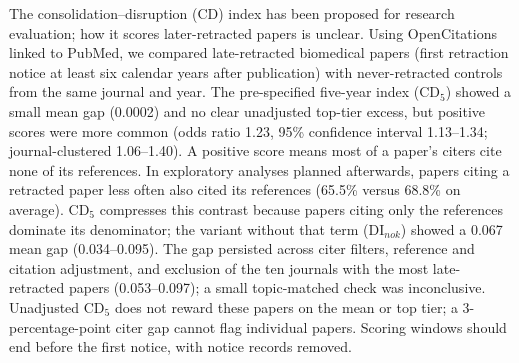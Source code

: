 The consolidation--disruption (CD) index has been proposed for research evaluation; how it scores later-retracted
papers is unclear. Using OpenCitations linked to PubMed, we compared late-retracted biomedical papers (first retraction
notice at least six calendar years after publication) with never-retracted controls from the same journal and year.
The pre-specified five-year index (CD$_5$) showed a small mean gap (0.0002) and no clear unadjusted top-tier excess, but positive scores
were more common (odds ratio 1.23, 95\% confidence interval 1.13--1.34; journal-clustered 1.06--1.40).
A positive score means most of a paper's citers cite none of its references.
In exploratory analyses planned afterwards, papers citing a retracted paper less often also cited its references
(65.5\% versus 68.8\% on average).
CD$_5$ compresses this contrast because papers citing only the references dominate its denominator; the variant
without that term (DI$_{nok}$) showed a 0.067 mean gap (0.034--0.095).
The gap persisted across citer filters, reference and citation adjustment, and exclusion of the ten journals with
the most late-retracted papers (0.053--0.097); a small topic-matched check was inconclusive.
Unadjusted CD$_5$ does not reward these papers on the mean or top tier; a 3-percentage-point citer gap cannot flag
individual papers.
Scoring windows should end before the first notice, with notice records removed.
